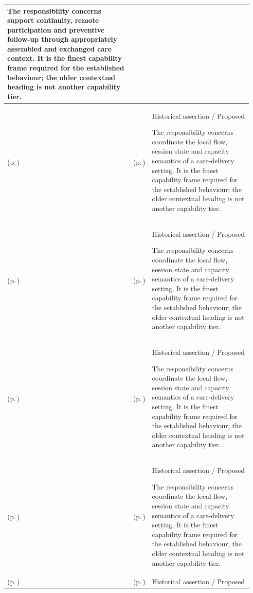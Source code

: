 \begin{longtable}{|>{\raggedright\arraybackslash}p{0.27\TableWidth}|>{\raggedright\arraybackslash}p{0.27\TableWidth}|>{\raggedright\arraybackslash}p{0.46\TableWidth}|}
The responsibility concerns support continuity, remote participation and preventive follow-up through appropriately assembled and exchanged care context. It is the finest capability frame required for the established behaviour; the older contextual heading is not another capability tier.\\\hline
\nameref{cap:bec-care-setting-operations-enablement} (p.\,\pageref{cap:bec-care-setting-operations-enablement}) & \nameref{cap:bec-clinic-practice-operations} (p.\,\pageref{cap:bec-clinic-practice-operations}) & Historical assertion / Proposed

The responsibility concerns coordinate the local flow, session state and capacity semantics of a care-delivery setting. It is the finest capability frame required for the established behaviour; the older contextual heading is not another capability tier.\\\hline
\nameref{cap:bec-care-setting-operations-enablement} (p.\,\pageref{cap:bec-care-setting-operations-enablement}) & \nameref{cap:bec-ward-operations} (p.\,\pageref{cap:bec-ward-operations}) & Historical assertion / Proposed

The responsibility concerns coordinate the local flow, session state and capacity semantics of a care-delivery setting. It is the finest capability frame required for the established behaviour; the older contextual heading is not another capability tier.\\\hline
\nameref{cap:bec-care-setting-operations-enablement} (p.\,\pageref{cap:bec-care-setting-operations-enablement}) & \nameref{cap:bec-theatre-operations} (p.\,\pageref{cap:bec-theatre-operations}) & Historical assertion / Proposed

The responsibility concerns coordinate the local flow, session state and capacity semantics of a care-delivery setting. It is the finest capability frame required for the established behaviour; the older contextual heading is not another capability tier.\\\hline
\nameref{cap:bec-care-setting-operations-enablement} (p.\,\pageref{cap:bec-care-setting-operations-enablement}) & \nameref{cap:bec-emergency-department-operations} (p.\,\pageref{cap:bec-emergency-department-operations}) & Historical assertion / Proposed

The responsibility concerns coordinate the local flow, session state and capacity semantics of a care-delivery setting. It is the finest capability frame required for the established behaviour; the older contextual heading is not another capability tier.\\\hline
\nameref{cap:bec-care-setting-operations-enablement} (p.\,\pageref{cap:bec-care-setting-operations-enablement}) & \nameref{cap:bec-outpatient-operations} (p.\,\pageref{cap:bec-outpatient-operations}) & Historical assertion / Proposed


\end{longtable}
